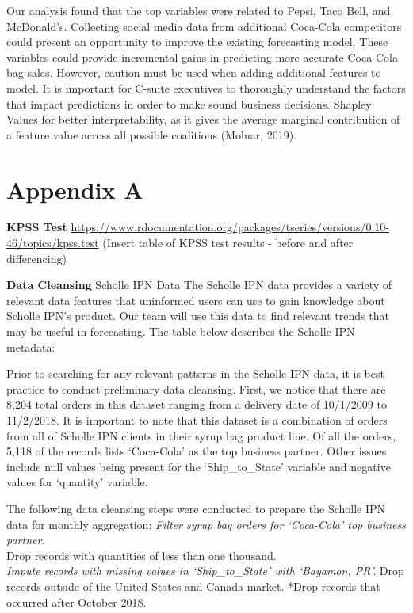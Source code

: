 \documentclass[12pt,oneside]{chicagocapstone}
\begin{document}
Our analysis found that the top variables were related to Pepsi, Taco Bell, and McDonald's. Collecting social media data from additional Coca-Cola competitors could present an opportunity to improve the existing forecasting model. These variables could provide incremental gains in predicting more accurate Coca-Cola bag sales. However, caution must be used when adding additional features to model. It is important for C-suite executives to thoroughly understand the factors that impact predictions in order to make sound business decisions. Shapley Values for better interpretability, as it gives the average marginal contribution of a feature value across all possible coalitions (Molnar, 2019).

\newpage

\appendix

\hypertarget{appendix}{%
\chapter*{Appendix A}\label{appendix}}

\textbf{KPSS Test}
\url{https://www.rdocumentation.org/packages/tseries/versions/0.10-46/topics/kpss.test}
(Insert table of KPSS test results - before and after differencing)

\textbf{Data Cleansing}
Scholle IPN Data
The Scholle IPN data provides a variety of relevant data features that uninformed users can use to gain knowledge about Scholle IPN's product. Our team will use this data to find relevant trends that may be useful in forecasting. The table below describes the Scholle IPN metadata:

Prior to searching for any relevant patterns in the Scholle IPN data, it is best practice to conduct preliminary data cleansing. First, we notice that there are 8,204 total orders in this dataset ranging from a delivery date of 10/1/2009 to 11/2/2018. It is important to note that this dataset is a combination of orders from all of Scholle IPN clients in their syrup bag product line. Of all the orders, 5,118 of the records lists `Coca-Cola' as the top business partner. Other issues include null values being present for the `Ship\_to\_State' variable and negative values for `quantity' variable.

The following data cleansing steps were conducted to prepare the Scholle IPN data for monthly aggregation:
\emph{Filter syrup bag orders for `Coca-Cola' top business partner.\\
}Drop records with quantities of less than one thousand.\\
\emph{Impute records with missing values in `Ship\_to\_State' with `Bayamon, PR'.
}Drop records outside of the United States and Canada market.
*Drop records that occurred after October 2018.
\end{document}
